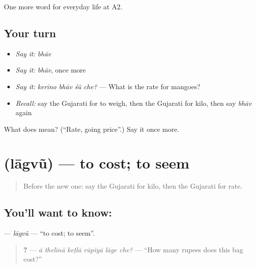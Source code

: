 \begin{grammarlens}[title={What you've built}]
One more word for everyday life at A2.
\end{grammarlens}

\subsection*{Your turn}
\begin{itemize}
\raggedright
  \item \emph{Say it:} \emph{bhāv}
  \item \emph{Say it:} \emph{bhāv}, once more
  \item \emph{Say it:} \emph{kerīno bhāv śũ che?} — What is the rate for mangoes?
  \item \emph{Recall:} say the Gujarati for to weigh, then the Gujarati for kilo, then say \emph{bhāv} again
\end{itemize}

\begin{tcolorbox}[breakable,colback=teal!4,colframe=teal!35!black,title={Before you move on}]
What does  mean? (\textquotedblleft{}Rate, going price\textquotedblright{}.) Say it once more.
\end{tcolorbox}
\section[\texorpdfstring{\gu{લાગવું} (lāgvũ)}{લાગવું (lāgvũ)}]{ (lāgvũ) — to cost; to seem}

\label{lesson:GU-C184-lagvu}



\begin{quote}
Before the new one: say the Gujarati for kilo, then the Gujarati for rate.
\end{quote}

\subsection*{You'll want to know: }
\textbf{} — \emph{lāgvũ} — \textquotedblleft{}to cost; to seem\textquotedblright{}.

\begin{quote}
\textbf{     ?} — \emph{ā thelīnā keṭlā rūpiyā lāge che?} — \textquotedblleft{}How many rupees does this bag cost?\textquotedblright{}
\end{quote}

